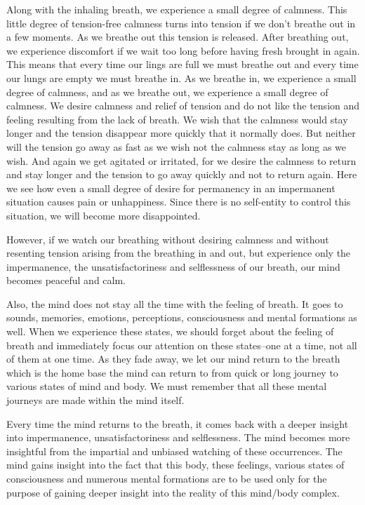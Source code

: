 Along with the inhaling breath, we experience a small degree of calmness. This
little degree of tension-free calmness turns into tension if we don't breathe
out in a few moments. As we breathe out this tension is released. After
breathing out, we experience discomfort if we wait too long before having fresh
brought in again. This means that every time our lings are full we must breathe
out and every time our lungs are empty we must breathe in. As we breathe in, we
experience a small degree of calmness, and as we breathe out, we experience a
small degree of calmness. We desire calmness and relief of tension and do not
like the tension and feeling resulting from the lack of breath. We wish that the
calmness would stay longer and the tension disappear more quickly that it
normally does. But neither will the tension go away as fast as we wish not the
calmness stay as long as we wish. And again we get agitated or irritated, for we
desire the calmness to return and stay longer and the tension to go away quickly
and not to return again. Here we see how even a small degree of desire for
permanency in an impermanent situation causes pain or unhappiness.
Since there is no self-entity to control this situation, we will become more
disappointed.

However, if we watch our breathing without desiring calmness and without
resenting tension arising from the breathing in and out, but experience only the
impermanence, the unsatisfactoriness and selflessness of our breath, our mind
becomes peaceful and calm.

Also, the mind does not stay all the time with the feeling of breath. It goes to
sounds, memories, emotions, perceptions, consciousness and mental formations as
well. When we experience these states, we should forget about the feeling of
breath and immediately focus our attention on these states--one at a time, not
all of them at one time. As they fade away, we let our mind return to the breath
which is the home base the mind can return to from quick or long journey to
various states of mind and body. We must remember that all these mental
journeys are made within the mind itself.

Every time the mind returns to the breath, it comes back with a deeper insight
into impermanence, unsatisfactoriness and selflessness. The mind becomes more
insightful from the impartial and unbiased watching of these occurrences. The
mind gains insight into the fact that this body, these feelings, various states
of consciousness and numerous mental formations are to be used only for the
purpose of gaining deeper insight into the reality of this mind/body complex.